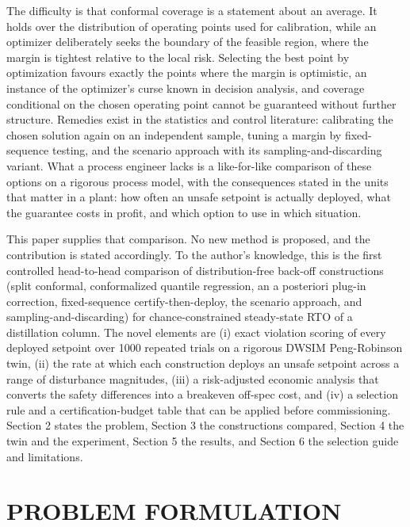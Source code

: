 \documentclass[12pt]{article}
\begin{document}
The difficulty is that conformal coverage is a statement about an average. It holds over the
distribution of operating points used for calibration, while an optimizer deliberately seeks the
boundary of the feasible region, where the margin is tightest relative to the local risk. Selecting
the best point by optimization favours exactly the points where the margin is optimistic, an
instance of the optimizer's curse known in decision analysis,\citep{smith2006} and coverage
conditional on the chosen operating point cannot be guaranteed without further structure.\citep{foygelbarber2021} Remedies exist in the statistics and control literature: calibrating the
chosen solution again on an independent sample,\citep{zhao2024cpp} tuning a margin by
fixed-sequence testing,\citep{angelopoulos2021ltt,einbinder2025} and the scenario approach with
its sampling-and-discarding variant.\citep{calafiore2006,campi2008,campi2011} What a process
engineer lacks is a like-for-like comparison of these options on a rigorous process model, with the
consequences stated in the units that matter in a plant: how often an unsafe setpoint is actually
deployed, what the guarantee costs in profit, and which option to use in which situation.

This paper supplies that comparison. No new method is proposed, and the contribution is stated
accordingly. To the author's knowledge, this is the first controlled head-to-head comparison of
distribution-free back-off constructions (split conformal, conformalized quantile regression, an a
posteriori plug-in correction, fixed-sequence certify-then-deploy, the scenario approach, and
sampling-and-discarding) for chance-constrained steady-state RTO of a distillation column. The
novel elements are (i) exact violation scoring of every deployed setpoint over 1000 repeated trials
on a rigorous DWSIM Peng-Robinson twin, (ii) the rate at which each construction deploys an unsafe
setpoint across a range of disturbance magnitudes, (iii) a risk-adjusted economic analysis that
converts the safety differences into a breakeven off-spec cost, and (iv) a selection rule and a
certification-budget table that can be applied before commissioning. Section
2 states the problem, Section 3 the constructions compared, Section 4 the twin and the experiment,
Section 5 the results, and Section 6 the selection guide and limitations.

\section{PROBLEM FORMULATION}
\end{document}
